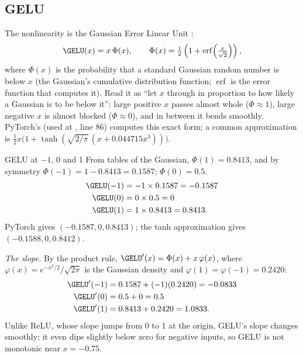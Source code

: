 \subsection{GELU}

The nonlinearity is the Gaussian Error Linear Unit \citep{hendrycks2016gaussian}:
\begin{equation}\label{eq:block:gelu}
  \GELU(x) = x\,\Phi(x),\qquad \Phi(x) = \tfrac12\left(1 + \operatorname{erf}\!\left(\tfrac{x}{\sqrt2}\right)\right),
\end{equation}
where $\Phi(x)$ is the probability that a standard Gaussian random number is below $x$ (the
Gaussian's cumulative distribution function; $\operatorname{erf}$ is the error function that
computes it). Read it as ``let $x$ through in proportion to how likely a Gaussian is to be below
it'': large positive $x$ passes almost whole ($\Phi \approx 1$), large negative $x$ is almost
blocked ($\Phi\approx 0$), and in between it bends smoothly. PyTorch's  (used at
, line 86) computes this exact form; a common approximation is
$\tfrac12 x\big(1 + \tanh(\sqrt{2/\pi}\,(x + 0.044715x^3))\big)$.

\begin{worked}[label={we:block:gelu}]{GELU at $-1$, 0 and 1}
From tables of the Gaussian, $\Phi(1) = 0.8413$, and by symmetry $\Phi(-1) = 1 - 0.8413 =
0.1587$; $\Phi(0) = 0.5$.
\begin{align*}
  \GELU(-1) &= -1\times0.1587 = -0.1587\\
  \GELU(0) &= 0\times0.5 = 0\\
  \GELU(1) &= 1\times0.8413 = 0.8413 .
\end{align*}
PyTorch gives $(-0.1587, 0, 0.8413)$\tagC; the tanh approximation gives
$(-0.1588, 0, 0.8412)$.

\emph{The slope.} By the product rule, $\GELU'(x) = \Phi(x) + x\,\varphi(x)$, where
$\varphi(x) = e^{-x^2/2}/\sqrt{2\pi}$ is the Gaussian density and $\varphi(1) = \varphi(-1) =
0.2420$:
\begin{align*}
  \GELU'(-1) &= 0.1587 + (-1)(0.2420) = -0.0833\\
  \GELU'(0) &= 0.5 + 0 = 0.5\\
  \GELU'(1) &= 0.8413 + 0.2420 = 1.0833 .
\end{align*}
Unlike ReLU, whose slope jumps from 0 to 1 at the origin, GELU's slope changes smoothly; it even
dips slightly below zero for negative inputs, so GELU is not monotonic near $x = -0.75$.
\end{worked}

